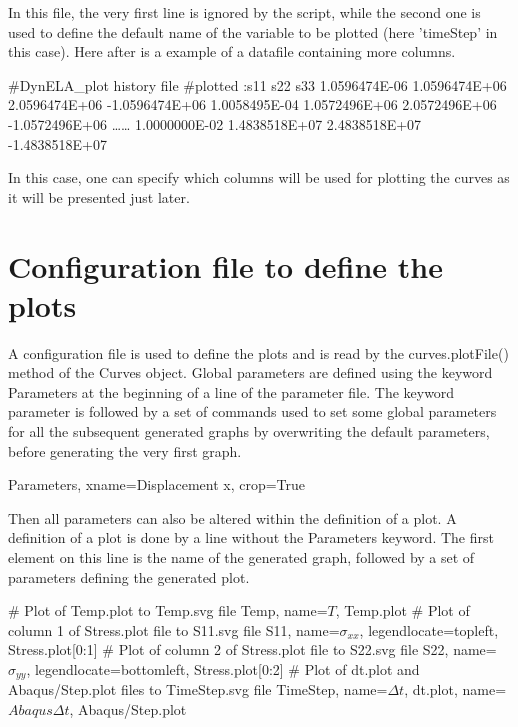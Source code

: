 In this file, the very first line is ignored by the script, while the second one is used to define the default name of the variable to be plotted (here 'timeStep' in this case). Here after is a example of a datafile containing more columns.

\begin{PythonListing}
#DynELA_plot history file
#plotted :s11 s22 s33 
1.0596474E-06 1.0596474E+06 2.0596474E+06 -1.0596474E+06 
1.0058495E-04 1.0572496E+06 2.0572496E+06 -1.0572496E+06 
\ldots\ldots
1.0000000E-02 1.4838518E+07 2.4838518E+07 -1.4838518E+07 
\end{PythonListing}

In this case, one can specify which columns will be used for plotting the curves as it will be presented just later.

\section{Configuration file to define the plots}

A configuration file is used to define the plots and is read by the \textsf{curves.plotFile()} method of the Curves object. Global parameters are defined using the keyword \textsf{Parameters} at the beginning of a line of the parameter file. The keyword parameter is followed by a set of commands used to set some global parameters for all the subsequent generated graphs by overwriting the default parameters, before generating the very first graph.

\begin{PythonListing}
Parameters, xname=Displacement x, crop=True
\end{PythonListing}

Then all parameters can also be altered within the definition of a plot. A definition of a plot is done by a line without the \textsf{Parameters} keyword. The first element on this line is the name of the generated graph, followed by a set of parameters defining the generated plot.

\begin{PythonListing}
# Plot of Temp.plot to Temp.svg file
Temp, name=$T$, Temp.plot
# Plot of column 1 of Stress.plot file to S11.svg file
S11, name=$\sigma_{xx}$, legendlocate=topleft, Stress.plot[0:1]
# Plot of column 2 of Stress.plot file to S22.svg file
S22, name=$\sigma_{yy}$, legendlocate=bottomleft, Stress.plot[0:2]
# Plot of dt.plot and Abaqus/Step.plot files to TimeStep.svg file
TimeStep, name=$\Delta t$, dt.plot, name=$Abaqus \Delta t$, Abaqus/Step.plot
\end{PythonListing}

